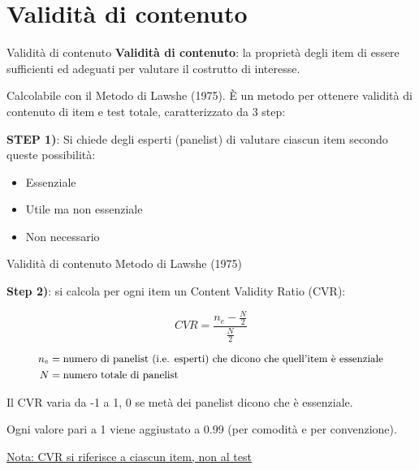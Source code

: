 \documentclass[
  ignorenonframetext,
]{beamer}
\providecommand{\tightlist}{%
  \setlength{\itemsep}{0pt}\setlength{\parskip}{0pt}}
\begin{document}
\section{Validità di contenuto}\label{validituxe0-di-contenuto}

\begin{frame}{Validità di contenuto}
\label{validituxe0-di-contenuto-1}
\textbf{Validità di contenuto}: la proprietà degli item di essere
sufficienti ed adeguati per valutare il costrutto di interesse.
\vspace{2em}

Calcolabile con il Metodo di Lawshe (1975). È un metodo per ottenere
validità di contenuto di item e test totale, caratterizzato da 3 step:

\textbf{STEP 1)}: Si chiede degli esperti (panelist) di valutare ciascun
item secondo queste possibilità:

\begin{itemize}
\tightlist
\item
  Essenziale
\item
  Utile ma non essenziale
\item
  Non necessario
\end{itemize}
\end{frame}

\begin{frame}{Validità di contenuto}
\label{validituxe0-di-contenuto-2}
Metodo di Lawshe (1975) \vspace{1em}

\textbf{Step 2)}: si calcola per ogni item un Content Validity Ratio
(CVR):

\[
CVR = \frac{n_e - \frac{N}{2}}{\frac{N}{2}}
\]

\[
\small
\begin{aligned}
n_e & = \text{numero di panelist (i.e. esperti) che dicono che quell’item è essenziale} \\
N & = \text{numero totale di panelist} \\
\end{aligned}
\]

Il CVR varia da -1 a 1, 0 se metà dei panelist dicono che è essenziale.

Ogni valore pari a 1 viene aggiustato a 0.99 (per comodità e per
convenzione).

\underline{Nota: CVR si riferisce a ciascun item, non al test}
\end{frame}
\end{document}
